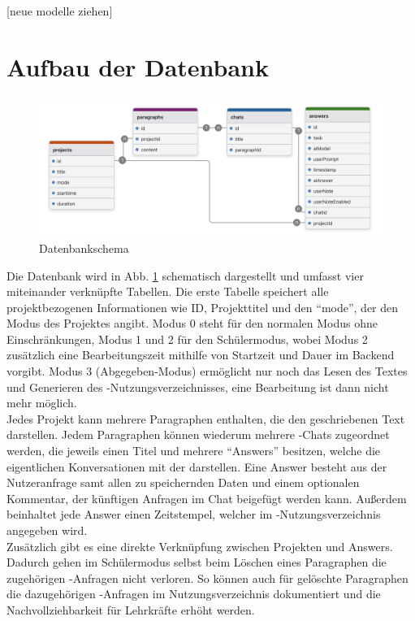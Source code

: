 \documentclass[../main.tex]{subfiles}
\begin{document}
[neue modelle ziehen]

\section{Aufbau der Datenbank}
\begin{figure}[h!]
  \includegraphics[scale=0.14]{bilder/Datenbank.png}
  \caption{Datenbankschema}
  \label{fig:data}
\end{figure}
Die Datenbank wird in Abb. \ref{fig:data} schematisch dargestellt und umfasst vier miteinander verknüpfte Tabellen. Die erste Tabelle speichert alle projektbezogenen Informationen wie ID, 
Projekttitel und den "`mode"', der den Modus des Projektes angibt. Modus 0 steht für den normalen Modus ohne Einschränkungen, Modus 1 und 2 für den Schülermodus, wobei Modus 2 zusätzlich 
eine Bearbeitungszeit mithilfe von Startzeit und Dauer im Backend vorgibt. Modus 3 (Abgegeben-Modus) ermöglicht nur noch das Lesen des Textes und Generieren des -Nutzungsverzeichnisses, 
eine Bearbeitung ist dann nicht mehr möglich.\\ Jedes Projekt kann mehrere Paragraphen enthalten, die den geschriebenen Text darstellen. Jedem Paragraphen können wiederum mehrere 
-Chats zugeordnet werden, die jeweils einen Titel und mehrere "`Answers"' besitzen, welche die eigentlichen Konversationen mit der  darstellen. Eine Answer besteht aus 
der Nutzeranfrage samt allen zu speichernden Daten und einem optionalen Kommentar, der künftigen Anfragen im Chat beigefügt werden kann. Außerdem beinhaltet jede Answer einen 
Zeitstempel, welcher im -Nutzungsverzeichnis angegeben wird.\\ Zusätzlich gibt es eine direkte Verknüpfung zwischen Projekten und Answers. Dadurch gehen im 
Schülermodus selbst beim Löschen eines Paragraphen die zugehörigen -Anfragen nicht verloren. So können auch für gelöschte Paragraphen die dazugehörigen -Anfragen 
im Nutzungsverzeichnis dokumentiert und die Nachvollziehbarkeit für Lehrkräfte erhöht werden.
\end{document}
